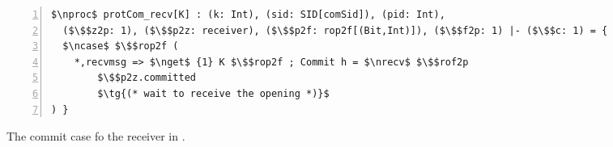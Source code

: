\centering
\begin{lstlisting}[basicstyle=\scriptsize\BeraMonottFamily, frame=single, mathescape, numbers=left, xleftmargin=2em, xrightmargin=2em]
$\nproc$ protCom_recv[K] : (k: Int), (sid: SID[comSid]), (pid: Int), 
  ($\$$z2p: 1), ($\$$p2z: receiver), ($\$$p2f: rop2f[(Bit,Int)]), ($\$$f2p: 1) |- ($\$$c: 1) = {
  $\ncase$ $\$$rop2f (
    *,recvmsg => $\nget$ {1} K $\$$rop2f ; Commit h = $\nrecv$ $\$$rof2p
        $\$$p2z.committed 
        $\tg{(* wait to receive the opening *)}$
) }
\end{lstlisting}
\caption{The commit case fo the receiver in \protcom.}
\label{fig:protcomreceiver}
